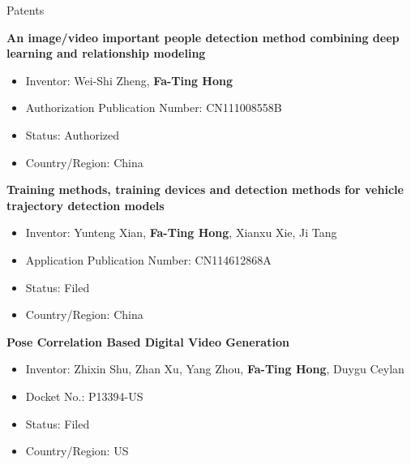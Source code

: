 \documentclass{resume} %
\begin{document}
\begin{rSection}{Patents}

{\bf An image/video important people detection method combining deep learning and relationship modeling}
\begin{itemize}[leftmargin=18pt]
\setlength{\itemsep}{-5pt}
    \item Inventor: Wei-Shi Zheng, \textbf{Fa-Ting Hong}
    \item Authorization Publication Number: CN111008558B
    \item Status: Authorized
    \item Country/Region: China
\end{itemize}

{\bf Training methods, training devices and detection methods for vehicle trajectory detection models}
\begin{itemize}[leftmargin=18pt]
\setlength{\itemsep}{-5pt}
    \item Inventor: Yunteng Xian, \textbf{Fa-Ting Hong}, Xianxu Xie, Ji Tang
    \item Application Publication Number: CN114612868A
    \item Status: Filed
    \item Country/Region: China
\end{itemize}

{\bf Pose Correlation Based Digital Video Generation}
\begin{itemize}[leftmargin=18pt]
\setlength{\itemsep}{-5pt}
    \item Inventor: Zhixin Shu, Zhan Xu, Yang Zhou, \textbf{Fa-Ting Hong}, Duygu Ceylan
    \item Docket No.: P13394-US
    \item Status: Filed
    \item Country/Region: US
\end{itemize}
\end{rSection}
\end{document}
